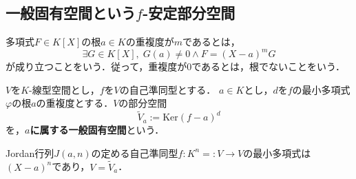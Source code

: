 \documentclass[uplatex, dvipdfmx]{jsreport}
\begin{document}
\subsection{一般固有空間という$f$-安定部分空間}

\begin{definition}[multiplicity]
    多項式$F\in K[X]$の根$a\in K$の重複度が$m$であるとは，
    \[ \exists G\in K[X],\; G(a)\ne 0\land F=(X-a)^mG \]
    が成り立つことをいう．従って，重複度が$0$であるとは，根でないことをいう．
\end{definition}

\begin{definition}
    $V$を$K$-線型空間とし，$f$を$V$の自己準同型とする．
    $a\in K$とし，$d$を$f$の最小多項式$\varphi$の根$a$の重複度とする．$V$の部分空間
    \[\widetilde{V}_a:=\mathrm{Ker}(f-a)^d\]
    を，\textbf{$a$に属する一般固有空間}という．
\end{definition}

\begin{example}
    Jordan行列$J(a,n)$の定める自己準同型$f:K^n=:V\to V$の最小多項式は$(X-a)^n$であり，$V=\tilde{V}_a$．
\end{example}
\end{document}
